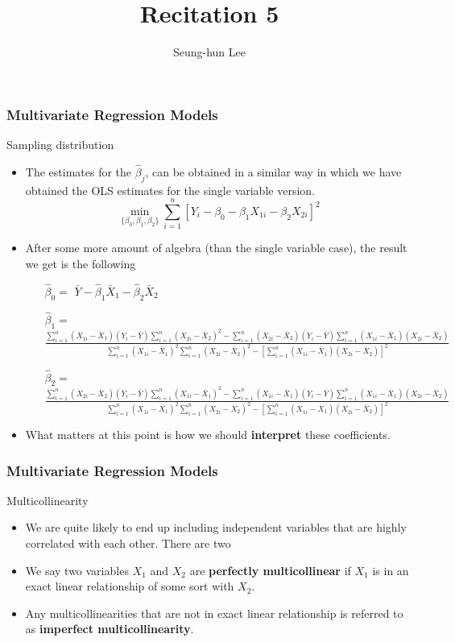 \documentclass[compress]{beamer}
\title[Recitation 5]{Recitation 5} %
\author[Seung-hun Lee]{Seung-hun Lee}
\institute[Columbia University]{Columbia University}
\date[]{}
\begin{document}
\begin{frame}
\titlepage
\end{frame}



\begin{frame}
\frametitle{Multivariate Regression Models}
Sampling distribution 
\begin{itemize}
\item The estimates for the $\hat{\beta}_j$, can be obtained in a similar way in which we have obtained the OLS estimates for the single variable version.
\[
\min_{\{\beta_0,\beta_1,\beta_2\}} \sum_{i=1}^n[Y_i-\beta_0 - \beta_1X_{1i}-\beta_2X_{2i}]^2
\]
\item After some more amount of algebra (than the single variable case), the result we get is the following
\begin{itemize}
\item[$\hat{\beta}_0=$] $\bar{Y}-\hat{\beta}_1\bar{X}_1-\hat{\beta}_2\bar{X}_2$
\item[$\hat{\beta}_1=$] $\frac{\sum_{i=1}^n (X_{1i}-\bar{X}_1)(Y_{i}-\bar{Y})\sum_{i=1}^n(X_{2i}-\bar{X}_2)^2-\sum_{i=1}^n (X_{2i}-\bar{X}_2)(Y_{i}-\bar{Y})\sum_{i=1}^n(X_{1i}-\bar{X}_1)(X_{2i}-\bar{X}_2)}{\sum_{i=1}^n (X_{1i}-\bar{X}_1)^2\sum_{i=1}^n (X_{2i}-\bar{X}_2)^2-[\sum_{i=1}^n (X_{1i}-\bar{X}_1)(X_{2i}-\bar{X}_2)]^2}$
\item[$\hat{\beta}_2=$] $\frac{\sum_{i=1}^n (X_{2i}-\bar{X}_2)(Y_{i}-\bar{Y})\sum_{i=1}^n(X_{1i}-\bar{X}_1)^2-\sum_{i=1}^n (X_{1i}-\bar{X}_1)(Y_{i}-\bar{Y})\sum_{i=1}^n(X_{1i}-\bar{X}_1)(X_{2i}-\bar{X}_2)}{\sum_{i=1}^n (X_{1i}-\bar{X}_1)^2\sum_{i=1}^n (X_{2i}-\bar{X}_2)^2-[\sum_{i=1}^n (X_{1i}-\bar{X}_1)(X_{2i}-\bar{X}_2)]^2}$
\end{itemize} \par\medskip
\item What matters at this point is how we should \textbf{interpret} these coefficients. 
\end{itemize}
\end{frame}

\begin{frame}
\frametitle{Multivariate Regression Models}
Multicollinearity
\begin{itemize}
\item We are quite likely to end up including independent variables that are highly correlated with each other. There are two \item We say two variables $X_1$ and $X_2$ are \textbf{perfectly multicollinear} if $X_1$ is in an exact linear relationship of some sort with $X_2$.
\item Any multicollinearities that are not in exact linear relationship is referred to as \textbf{imperfect multicollinearity}. 
\end{itemize}
\end{frame}
\end{document}
